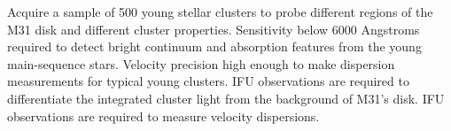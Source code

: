 \documentclass[11pt,a4paper,twoside,onecolumn,openany,final,oldfontcommands]{memoir}
\def\YST#1{\noindent{\textcolor{lblue}{\textbf[YST: #1]}}}
\begin{document}
\begin{programrequirement}

\reqitem Acquire a sample of 500 young stellar clusters to probe different regions of the M31 disk and different cluster properties.
\reqitem Sensitivity below 6000 Angstroms required to detect bright continuum and absorption features from the young main-sequence stars.
\reqitem Velocity precision high enough to make dispersion measurements for typical young clusters.\YST{maybe be more specific?}  
\reqitem IFU observations are required to differentiate the integrated cluster light from the background of M31's disk.
\reqitem IFU observations are required to measure velocity dispersions.
\end{programrequirement}




\end{document}
